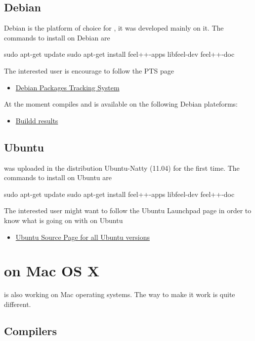 \subsection{Debian}

Debian is the platform of choice for \feel, it was developed mainly on it. The commands to install \feel on Debian are
\begin{unixcom}
  sudo apt-get update
  sudo apt-get install feel++-apps libfeel-dev feel++-doc
\end{unixcom}


The interested user is encourage to follow the \feel PTS page
\begin{itemize}
\item \feel \href{http://packages.qa.debian.org/f/feel%2B%2B.html}{Debian Packages Tracking System}
\end{itemize}

At the moment \feel compiles and is available on the following Debian
plateforms:
\begin{itemize}
\item \feel \href{https://buildd.debian.org/status/package.php?p=feel%2b%2b}{Buildd results}
\end{itemize}

\subsection{Ubuntu}

\feel was uploaded in the distribution Ubuntu-Natty (11.04) for the first
time. The commands to install \feel on Ubuntu are
\begin{unixcom}
  sudo apt-get update
  sudo apt-get install feel++-apps libfeel-dev feel++-doc
\end{unixcom}
The interested user might want to follow the Ubuntu Launchpad \feel page in
order to know what is going on with \feel on Ubuntu
\begin{itemize}
\item \feel \href{https://launchpad.net/ubuntu/+source/feel++}{Ubuntu Source
  Page for all Ubuntu versions}
\end{itemize}


\section{\Feel on Mac OS X}
\label{macosx}
\feel is also working on Mac operating systems. The way to make it work is quite different.

\subsection{Compilers}

